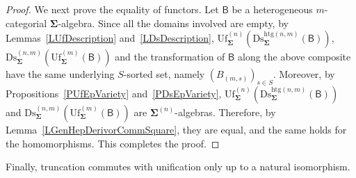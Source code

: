 \documentclass[a4paper, reqno]{amsbook}
\newcommand{\sig}[1]{\mathbf{#1}}             %
\newcommand{\calg}[1]{\boldsymbol{\mathsf{#1}}} %
\newcommand{\htg}{\mathrm{htg}}                %
\newcommand{\Uf}{\mathrm{Uf}}
\newcommand{\Ds}{\mathrm{Ds}}
\theoremstyle{plain}
\theoremstyle{definition}
\begin{document}
\begin{proof}
We next prove the equality of functors.
Let $\calg{B}$ be a heterogeneous $m$-categorial $\sig{\Sigma}$-algebra.
Since all the domains involved are empty, by Lemmas~\ref{LUfDescription} and~\ref{LDsDescription}, $\Uf^{(n)}_{\sig{\Sigma}}(\Ds^{\htg(n,m)}_{\sig{\Sigma}}(\calg{B}))$, $\Ds^{(n,m)}_{\sig{\Sigma}}(\Uf^{(m)}_{\sig{\Sigma}}(\calg{B}))$ and the transformation of $\calg{B}$ along the above composite have the same underlying $S$-sorted set, namely $(B_{(m,s)})_{s\in S}$.
Moreover, by Propositions~\ref{PUfEpVariety} and~\ref{PDsEpVariety}, $\Uf^{(n)}_{\sig{\Sigma}}(\Ds^{\htg(n,m)}_{\sig{\Sigma}}(\calg{B}))$ and $\Ds^{(n,m)}_{\sig{\Sigma}}(\Uf^{(m)}_{\sig{\Sigma}}(\calg{B}))$ are $\sig{\Sigma}^{(n)}$-algebras.
Therefore, by Lemma~\ref{LGenHepDerivorCommSquare}, they are equal, and the same holds for the homomorphisms. This completes the proof.
\end{proof}

Finally, truncation commutes with unification only up to a natural isomorphism.
\end{document}
